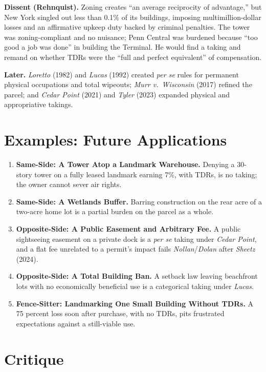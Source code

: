 \documentclass[12pt]{article}
\begin{document}
\textbf{Dissent (Rehnquist).} Zoning creates ``an average reciprocity of advantage,'' but New York singled out less than 0.1\% of its buildings, imposing multimillion-dollar losses and an affirmative upkeep duty backed by criminal penalties. The tower was zoning-compliant and no nuisance; Penn Central was burdened because ``too good a job was done'' in building the Terminal. He would find a taking and remand on whether TDRs were the ``full and perfect equivalent'' of compensation.

\textbf{Later.} \textit{Loretto} (1982) and \textit{Lucas} (1992) created \textit{per se} rules for permanent physical occupations and total wipeouts; \textit{Murr v.\ Wisconsin} (2017) refined the parcel; and \textit{Cedar Point} (2021) and \textit{Tyler} (2023) expanded physical and appropriative takings.

\section{Examples: Future Applications}

\begin{enumerate}
\item \textbf{Same-Side: A Tower Atop a Landmark Warehouse.} Denying a 30-story tower on a fully leased landmark earning 7\%, with TDRs, is no taking; the owner cannot sever air rights.
\item \textbf{Same-Side: A Wetlands Buffer.} Barring construction on the rear acre of a two-acre home lot is a partial burden on the parcel as a whole.
\item \textbf{Opposite-Side: A Public Easement and Arbitrary Fee.} A public sightseeing easement on a private dock is a \textit{per se} taking under \textit{Cedar Point}, and a flat fee unrelated to a permit's impact fails \textit{Nollan}/\textit{Dolan} after \textit{Sheetz} (2024).
\item \textbf{Opposite-Side: A Total Building Ban.} A setback law leaving beachfront lots with no economically beneficial use is a categorical taking under \textit{Lucas}.
\item \textbf{Fence-Sitter: Landmarking One Small Building Without TDRs.} A 75 percent loss soon after purchase, with no TDRs, pits frustrated expectations against a still-viable use.
\end{enumerate}

\section{Critique}
\end{document}
